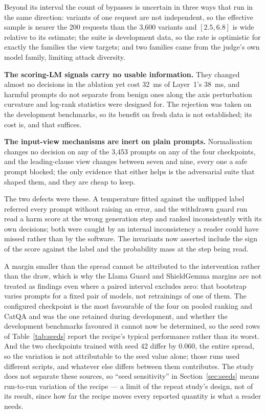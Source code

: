 \documentclass[journal]{IEEEtran}
\begin{document}
Beyond its interval the count of bypasses is uncertain in three ways that run in
the same direction: variants of one request are not independent, so the
effective sample is nearer the 200 requests than the 3{,}600 variants and
$[2.5, 6.8]$ is wide relative to its estimate; the suite is development data, so
the rate is optimistic for exactly the families the view targets; and two
families came from the judge's own model family, limiting attack diversity.

\textbf{The scoring-LM signals carry no usable information.} They changed almost
no decisions in the ablation yet cost \SI{32}{\milli\second} of Layer~1's
\SI{38}{\milli\second}, and harmful prompts do not separate from benign ones
along the axis perturbation curvature and log-rank statistics were designed for.
The rejection was taken on the development benchmarks, so its benefit on fresh
data is not established; its cost is, and that suffices.

\textbf{The input-view mechanisms are inert on plain prompts.} Normalisation
changes no decision on any of the 3{,}453 prompts on any of the four
checkpoints, and the leading-clause view changes between seven and nine, every
one a safe prompt blocked; the only evidence that either helps is the
adversarial suite that shaped them, and they are cheap to keep.

The two defects were these. A temperature fitted against the unflipped label
referred every prompt without raising an error, and the withdrawn guard run read
a harm score at the wrong generation step and ranked inconsistently with its own
decisions; both were caught by an internal inconsistency a reader could have
missed rather than by the software. The invariants now asserted include the sign
of the score against the label and the probability mass at the step being read.

A margin smaller than the spread cannot be attributed to the intervention rather
than the draw, which is why the Llama Guard and ShieldGemma margins are not
treated as findings even where a paired interval excludes zero: that bootstrap
varies prompts for a fixed pair of models, not retrainings of one of them. The
configured checkpoint is the most favourable of the four on pooled ranking and
CatQA and was the one retained during development, and whether the development
benchmarks favoured it cannot now be determined, so the seed rows of
Table~\ref{tab:seeds} report the recipe's typical performance rather than its
worst. And the two checkpoints trained with seed 42 differ by \num{0.060}, the
entire spread, so the variation is not attributable to the seed value alone;
those runs used different scripts, and whatever else differs between them
contributes. The study does not separate these sources, so ``seed sensitivity''
in Section~\ref{sec:seeds} means run-to-run variation of the recipe --- a limit
of the repeat study's design, not of its result, since how far the recipe moves
every reported quantity is what a reader needs.
\end{document}
